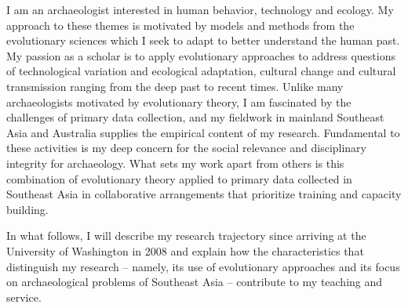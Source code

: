 \documentclass[11pt,article,oneside]{memoir}
\begin{document}


\nonzeroparskip
\setlength{\parindent}{0pt}

\bigskip       


I am an archaeologist interested in human behavior, technology and ecology. My approach to these themes is motivated by models and methods from the evolutionary sciences which I seek to adapt to better understand the human past. My passion as a scholar is to apply evolutionary approaches to address questions of technological variation and ecological adaptation, cultural change and cultural transmission ranging from the deep past to recent times. Unlike many archaeologists motivated by evolutionary theory, I am fascinated by the challenges of primary data collection, and my fieldwork in mainland Southeast Asia and Australia supplies the empirical content of my research. Fundamental to these activities is my deep concern for the social relevance and disciplinary integrity for archaeology. What sets my work apart from others is this combination of evolutionary theory applied to primary data collected in Southeast Asia in collaborative arrangements that prioritize training and capacity building.  

In what follows, I will describe my research trajectory since arriving at the University of Washington in 2008 and explain how the characteristics that distinguish my research – namely, its use of evolutionary approaches and its focus on archaeological problems of Southeast Asia – contribute to my teaching and service. 
\end{document}
